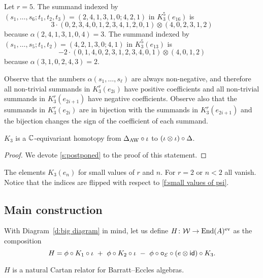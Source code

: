 \begin{example}
    Let $r=5$. The summand indexed by $(s_1,\ldots,s_6;t_1,t_2,t_3) = (2,4,1,3,1,0;4,2,1)$ in $K_3^5(e_{16})$ is
    \[
        3\cdot (0,2,3,4,0,1,2,3,4,1,2,0,1)\otimes (4,0,2,3,1,2)
    \]
    because $\alpha(2,4,1,3,1,0,4)=3$. The summand indexed by $(s_1,\ldots,s_5;t_1,t_2) =(4,2,1,3,0;4,1)$ in $K_3^5(e_{13})$ is
    \[
        -2\cdot (0,1,4,0,2,3,1,2,3,4,0,1)\otimes(4,0,1,2)
    \]
    because $\alpha(3,1,0,2,4,3)=2$.
\end{example}
Observe that the numbers $\alpha(s_1,\ldots,s_\ell)$ are always non-negative, and therefore all non-trivial summands in $K_3^r(e_{2i})$ have positive coefficients and all non-trivial summands in $K_3^r(e_{2i+1})$ have negative coefficients. Observe also that the summands in $K_3^r(e_{2i})$ are in bijection with the summands in $K_3^r(e_{2i+1})$ and the bijection changes the sign of the coefficient of each summand.

\begin{lemma}\label{l:K3}
	$K_3$ is a $\mathbb{C}$-equivariant homotopy from $\Delta_{\operatorname{AW}} \mathbin{\circ} \iota$ to $(\iota \otimes \iota) \mathbin{\circ} \Delta$.
\end{lemma}

\begin{proof}
	We devote \cref{s:postponed} to the proof of this statement.
\end{proof}


\begin{table}
	\centering
	
	\caption{The elements $K_3(e_n)$ for small values of $r$ and $n$. For $r=2$ or $n<2$ all vanish. Notice that the indices are flipped with respect to \cref{f:small values of psi}.}
	\label{f:small values of K}
\end{table}

\subsection{Main construction}

With Diagram~\eqref{d:big diagram} in mind, let us define $H \colon \mathcal{W} \to \mathrm{End}(A)^{\mathrm{ev}}$ as the composition
\[
H = \phi \mathbin{\circ} K_1 \mathbin{\circ} \iota \ +\ \phi \mathbin{\circ} K_2 \mathbin{\circ} \iota \ -\ \phi \mathbin{\circ} \bm{\mathbin{\circ}}_{\mathcal{E}} \mathbin{\circ} (e \otimes \mathsf{id}) \mathbin{\circ} K_3.
\]

\begin{theorem}
	$H$ is a natural Cartan relator for Barratt--Eccles algebras.
\end{theorem}

